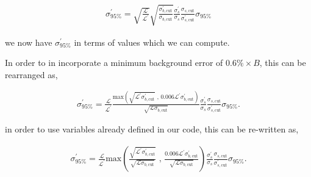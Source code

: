 \documentclass[12pt,a4paper]{article}
\begin{document}
\begin{align}
  \sigma_{\text{95\%}}^{\prime} = \sqrt{\frac{\mathcal{L}}{\mathcal{L}^{\prime}}} 
  \sqrt{\frac{\sigma_{b,\text{cut}}^{\prime}}{\sigma_{b,\text{cut}}}}
  \frac{\sigma_{s}^{\prime}}{\sigma_{s}}
  \frac{\sigma_{s,\text{cut}}}{\sigma_{s,\text{cut}}^{\prime}} \sigma_{\text{95\%}}
\end{align}

we now have $\sigma_{\text{95\%}}^{\prime}$ in terms of values which we can compute.

In order to in incorporate a minimum background error of $0.6\% \times B$, this can be rearranged as,

\begin{align}
  \sigma_{\text{95\%}}^{\prime} = \frac{\mathcal{L}}{\mathcal{L}^{\prime}}
  \frac{\textrm{max}\left( \sqrt{\mathcal{L}^{\prime} \sigma_{b,\text{cut}}^{\prime}}\textrm{ , } 0.006 \mathcal{L}^{\prime} \sigma_{b,\text{cut}}^{\prime} \right) }{ \sqrt{\mathcal{L} \sigma_{b,\text{cut}}}}
  \frac{\sigma_{s}^{\prime}}{\sigma_{s}}
  \frac{\sigma_{s,\text{cut}}}{\sigma_{s,\text{cut}}^{\prime}} \sigma_{\text{95\%}}.
\end{align}

in order to use variables already defined in our code, this can be re-written as,

\begin{align}
  \sigma_{\text{95\%}}^{\prime} = \frac{\mathcal{L}}{\mathcal{L}^{\prime}}
  \textrm{max}\left( \frac{\sqrt{\mathcal{L}^{\prime} \sigma_{b,\text{cut}}^{\prime}}}{\sqrt{\mathcal{L} \sigma_{b,\text{cut}}}}\textrm{ , } \frac{0.006 \mathcal{L}^{\prime} \sigma_{b,\text{cut}}^{\prime}}{\sqrt{\mathcal{L} \sigma_{b,\text{cut}}}} \right)  
  \frac{\sigma_{s}^{\prime}}{\sigma_{s}}
  \frac{\sigma_{s,\text{cut}}}{\sigma_{s,\text{cut}}^{\prime}} \sigma_{\text{95\%}}.
\end{align}
\end{document}
